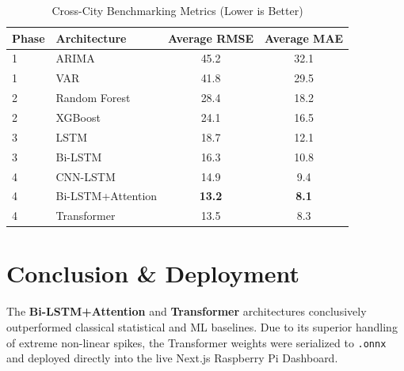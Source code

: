 \documentclass[11pt,a4paper,oneside]{book}
\begin{document}
\begin{table}[H]
\centering
\begin{tabular}{@{}llcc@{}}
\toprule
\textbf{Phase} & \textbf{Architecture} & \textbf{Average RMSE} & \textbf{Average MAE} \\ \midrule
1 & ARIMA & 45.2 & 32.1 \\
1 & VAR & 41.8 & 29.5 \\
2 & Random Forest & 28.4 & 18.2 \\
2 & XGBoost & 24.1 & 16.5 \\
3 & LSTM & 18.7 & 12.1 \\
3 & Bi-LSTM & 16.3 & 10.8 \\
4 & CNN-LSTM & 14.9 & 9.4 \\
4 & Bi-LSTM+Attention & \textbf{13.2} & \textbf{8.1} \\
4 & Transformer & 13.5 & 8.3 \\ \bottomrule
\end{tabular}
\caption{Cross-City Benchmarking Metrics (Lower is Better)}
\end{table}

\chapter{Conclusion \& Deployment}
The \textbf{Bi-LSTM+Attention} and \textbf{Transformer} architectures conclusively outperformed classical statistical and ML baselines. Due to its superior handling of extreme non-linear spikes, the Transformer weights were serialized to \texttt{.onnx} and deployed directly into the live Next.js Raspberry Pi Dashboard.
\end{document}
